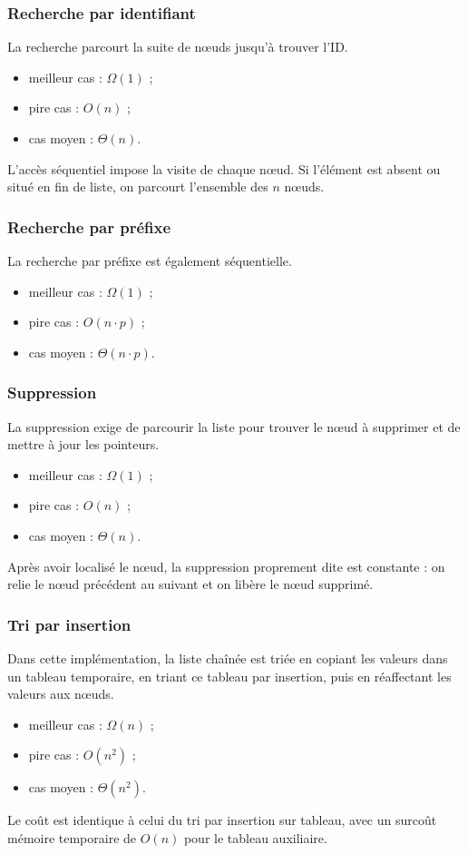 \documentclass[12pt,a4paper]{article}
\begin{document}
\subsubsection{Recherche par identifiant}
La recherche parcourt la suite de nœuds jusqu’à trouver l’ID.
\begin{itemize}
  \item meilleur cas : $\Omega(1)$ ;
  \item pire cas : $O(n)$ ;
  \item cas moyen : $\Theta(n)$.
\end{itemize}
L’accès séquentiel impose la visite de chaque nœud. Si l’élément est absent ou situé en fin de liste, on parcourt l’ensemble des $n$ nœuds.

\subsubsection{Recherche par préfixe}
La recherche par préfixe est également séquentielle.
\begin{itemize}
  \item meilleur cas : $\Omega(1)$ ;
  \item pire cas : $O(n \cdot p)$ ;
  \item cas moyen : $\Theta(n \cdot p)$.
\end{itemize}

\subsubsection{Suppression}
La suppression exige de parcourir la liste pour trouver le nœud à supprimer et de mettre à jour les pointeurs.
\begin{itemize}
  \item meilleur cas : $\Omega(1)$ ;
  \item pire cas : $O(n)$ ;
  \item cas moyen : $\Theta(n)$.
\end{itemize}
Après avoir localisé le nœud, la suppression proprement dite est constante : on relie le nœud précédent au suivant et on libère le nœud supprimé.

\subsubsection{Tri par insertion}
Dans cette implémentation, la liste chaînée est triée en copiant les valeurs dans un tableau temporaire, en triant ce tableau par insertion, puis en réaffectant les valeurs aux nœuds.
\begin{itemize}
  \item meilleur cas : $\Omega(n)$ ;
  \item pire cas : $O(n^2)$ ;
  \item cas moyen : $\Theta(n^2)$.
\end{itemize}
Le coût est identique à celui du tri par insertion sur tableau, avec un surcoût mémoire temporaire de $O(n)$ pour le tableau auxiliaire.
\end{document}
